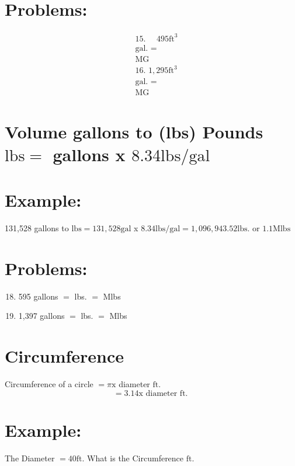 \documentclass[10pt]{article}
\begin{document}
\section{Problems:}
$$
\begin{aligned}
& \text { 15. } \quad 495 \mathrm{ft}^{3} \\
& \text { gal. = } \\
& \text { MG } \\
& \text { 16. } 1,295 \mathrm{ft}^{3} \\
& \text { gal. = } \\
& \text { MG }
\end{aligned}
$$

\section{Volume gallons to (lbs) Pounds 
 $\mathrm{lbs}=$ gallons x $8.34 \mathrm{lbs} / \mathrm{gal}$}
\section{Example:}
131,528 gallons to $\mathrm{lbs}=131,528 \mathrm{gal}$ x $8.34 \mathrm{lbs} / \mathrm{gal}=1,096,943.52 \mathrm{lbs}$. or $1.1 \mathrm{Mlbs}$

\section{Problems:}
\begin{enumerate}
  \setcounter{enumi}{17}
  \item 595 gallons $=$ lbs. $=$ Mlbs

  \item 1,397 gallons $=$ lbs. $=$ Mlbs

\end{enumerate}
\section{Circumference}
Circumference of a circle $=\pi \mathrm{x}$ diameter $\mathrm{ft}$.
$$
=3.14 \mathrm{x} \text { diameter } \mathrm{ft} \text {. }
$$

\section{Example:}
The Diameter $=40 \mathrm{ft}$. What is the Circumference $\mathrm{ft}$.
\end{document}
